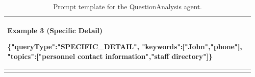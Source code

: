 {\begin{longtable}{@{}p{}@{}}
\textbf{Example 3 (Specific Detail)}\par

{\ttfamily
\{"queryType":"SPECIFIC\_DETAIL",\newline
"keywords":["John","phone"],\newline
"topics":["personnel contact information","staff directory"]\}
}
\\


\bottomrule
\caption{Prompt template for the QuestionAnalysis agent.}
\label{tab:question-analysis-prompt}\\

\end{longtable}
}